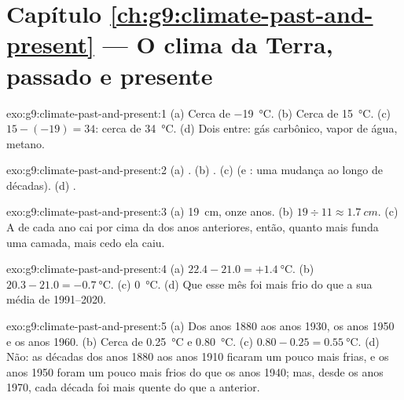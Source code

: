 \section*{Capítulo \ref{ch:g9:climate-past-and-present} --- O clima da Terra, passado e presente}

\begin{solution}{exo:g9:climate-past-and-present:1}
(a) Cerca de \qty{-19}{\degreeCelsius}. (b) Cerca de
\qty{15}{\degreeCelsius}. (c) $15 - (-19) = 34$: cerca de
\qty{34}{\degreeCelsius}. (d) Dois entre: gás carbônico, vapor de água,
metano.
\end{solution}

\begin{solution}{exo:g9:climate-past-and-present:2}
(a) . (b) . (c)  (e : uma mudança ao
longo de décadas). (d) .
\end{solution}

\begin{solution}{exo:g9:climate-past-and-present:3}
(a) \qty{19}{cm}, onze anos. (b) $19 \div 11 \approx \qty{1.7}{cm}$.
(c) A  de cada ano cai por cima da  dos anos anteriores, então,
quanto mais funda uma camada, mais cedo ela caiu.
\end{solution}

\begin{solution}{exo:g9:climate-past-and-present:4}
(a) $22.4 - 21.0 = +\qty{1.4}{\degreeCelsius}$. (b) $20.3 - 21.0 =
\qty{-0.7}{\degreeCelsius}$. (c) \qty{0}{\degreeCelsius}. (d) Que esse mês
foi mais frio do que a sua média de 1991--2020.
\end{solution}

\begin{solution}{exo:g9:climate-past-and-present:5}
(a) Dos anos 1880 aos anos 1930, os anos 1950 e os anos 1960. (b) Cerca
de \qty{0.25}{\degreeCelsius} e \qty{0.80}{\degreeCelsius}. (c) $0.80 -
0.25 = \qty{0.55}{\degreeCelsius}$. (d) Não: as décadas dos anos 1880 aos
anos 1910 ficaram um pouco mais frias, e os anos 1950 foram um pouco mais
frios do que os anos 1940; mas, desde os anos 1970, cada década foi mais
quente do que a anterior.
\end{solution}

